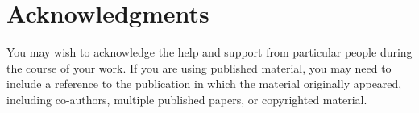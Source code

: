\chapter{Acknowledgments}

You may wish to acknowledge the help and support from particular people during the course of your work. If you are using published material, you may need to include a reference to the publication in which the material originally appeared, including co-authors, multiple published papers, or copyrighted material.
